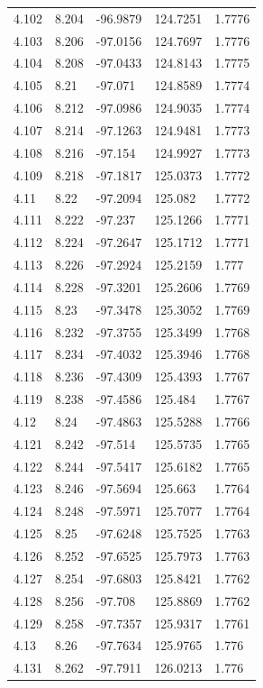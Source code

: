 \begin{tabular}{lllll}
4.102 & 8.204 & -96.9879 & 124.7251 & 1.7776 \\
4.103 & 8.206 & -97.0156 & 124.7697 & 1.7776 \\
4.104 & 8.208 & -97.0433 & 124.8143 & 1.7775 \\
4.105 & 8.21 & -97.071 & 124.8589 & 1.7774 \\
4.106 & 8.212 & -97.0986 & 124.9035 & 1.7774 \\
4.107 & 8.214 & -97.1263 & 124.9481 & 1.7773 \\
4.108 & 8.216 & -97.154 & 124.9927 & 1.7773 \\
4.109 & 8.218 & -97.1817 & 125.0373 & 1.7772 \\
4.11 & 8.22 & -97.2094 & 125.082 & 1.7772 \\
4.111 & 8.222 & -97.237 & 125.1266 & 1.7771 \\
4.112 & 8.224 & -97.2647 & 125.1712 & 1.7771 \\
4.113 & 8.226 & -97.2924 & 125.2159 & 1.777 \\
4.114 & 8.228 & -97.3201 & 125.2606 & 1.7769 \\
4.115 & 8.23 & -97.3478 & 125.3052 & 1.7769 \\
4.116 & 8.232 & -97.3755 & 125.3499 & 1.7768 \\
4.117 & 8.234 & -97.4032 & 125.3946 & 1.7768 \\
4.118 & 8.236 & -97.4309 & 125.4393 & 1.7767 \\
4.119 & 8.238 & -97.4586 & 125.484 & 1.7767 \\
4.12 & 8.24 & -97.4863 & 125.5288 & 1.7766 \\
4.121 & 8.242 & -97.514 & 125.5735 & 1.7765 \\
4.122 & 8.244 & -97.5417 & 125.6182 & 1.7765 \\
4.123 & 8.246 & -97.5694 & 125.663 & 1.7764 \\
4.124 & 8.248 & -97.5971 & 125.7077 & 1.7764 \\
4.125 & 8.25 & -97.6248 & 125.7525 & 1.7763 \\
4.126 & 8.252 & -97.6525 & 125.7973 & 1.7763 \\
4.127 & 8.254 & -97.6803 & 125.8421 & 1.7762 \\
4.128 & 8.256 & -97.708 & 125.8869 & 1.7762 \\
4.129 & 8.258 & -97.7357 & 125.9317 & 1.7761 \\
4.13 & 8.26 & -97.7634 & 125.9765 & 1.776 \\
4.131 & 8.262 & -97.7911 & 126.0213 & 1.776 \\

\end{tabular}
